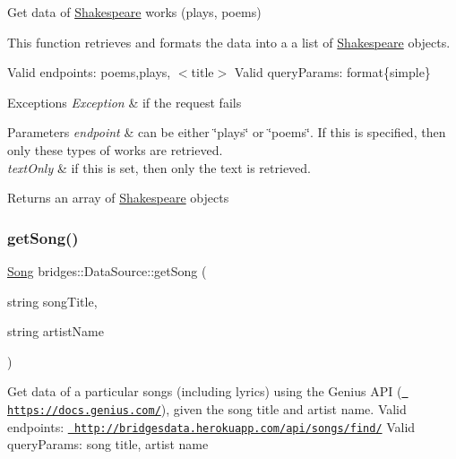 Get data of \mbox{\hyperlink{classbridges_1_1_shakespeare}{Shakespeare}} works (plays, poems)

This function retrieves and formats the data into a a list of \mbox{\hyperlink{classbridges_1_1_shakespeare}{Shakespeare}} objects.

Valid endpoints\+: \textquotesingle{}poems\textquotesingle{},\textquotesingle{}plays\textquotesingle{}, $<$title$>$ Valid query\+Params\+: format\{simple\}


\begin{DoxyExceptions}{Exceptions}
{\em Exception} & if the request fails\\
\hline
\end{DoxyExceptions}

\begin{DoxyParams}{Parameters}
{\em endpoint} & can be either \char`\"{}plays\char`\"{} or \char`\"{}poems\char`\"{}. If this is specified, then only these types of works are retrieved. \\
\hline
{\em text\+Only} & if this is set, then only the text is retrieved.\\
\hline
\end{DoxyParams}
\begin{DoxyReturn}{Returns}
an array of \mbox{\hyperlink{classbridges_1_1_shakespeare}{Shakespeare}} objects 
\end{DoxyReturn}
\mbox{\label{classbridges_1_1_data_source_a284c9d572415b67df6989ab8ab97d0e2}} 
\subsubsection{\texorpdfstring{getSong()}{getSong()}}
{\footnotesize\ttfamily \mbox{\hyperlink{classbridges_1_1_song}{Song}} bridges\+::\+Data\+Source\+::get\+Song (\begin{DoxyParamCaption}\item[{string}]{song\+Title,  }\item[{string}]{artist\+Name }\end{DoxyParamCaption})\hspace{0.3cm}{\ttfamily [inline]}}

Get data of a particular songs (including lyrics) using the Genius A\+PI (\href{https://docs.genius.com/}{\texttt{ https\+://docs.\+genius.\+com/}}), given the song title and artist name. Valid endpoints\+: \href{http://bridgesdata.herokuapp.com/api/songs/find/}{\texttt{ http\+://bridgesdata.\+herokuapp.\+com/api/songs/find/}} Valid query\+Params\+: song title, artist name

